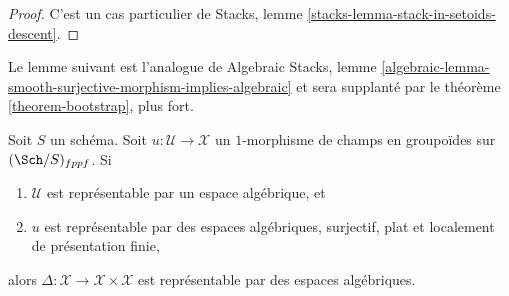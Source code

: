 \begin{proof}
C'est un cas particulier de
Stacks, lemme \ref{stacks-lemma-stack-in-setoids-descent}.
\end{proof}

\noindent
Le lemme suivant est l'analogue de
Algebraic Stacks, lemme
\ref{algebraic-lemma-smooth-surjective-morphism-implies-algebraic}
et sera supplanté par le
théorème \ref{theorem-bootstrap}, plus fort.

\begin{lemma}
\label{lemma-flat-finite-presentation-surjective-diagonal}
Soit $S$ un schéma.
Soit $u : \mathcal{U} \to \mathcal{X}$ un $1$-morphisme de
champs en groupoïdes sur $(\Sch/S)_{fppf}$. Si
\begin{enumerate}
\item $\mathcal{U}$ est représentable par un espace algébrique, et
\item $u$ est représentable par des espaces algébriques, surjectif, plat et
localement de présentation finie,
\end{enumerate}
alors
$\Delta : \mathcal{X} \to \mathcal{X} \times \mathcal{X}$
est représentable par des espaces algébriques.
\end{lemma}

